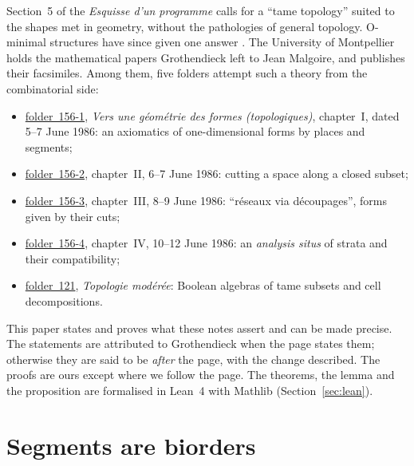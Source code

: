 \documentclass[11pt,a4paper]{amsart}
\theoremstyle{definition}
\theoremstyle{remark}
\newcommand{\fac}[1]{\href{https://grothendieck.umontpellier.fr/#1.pdf}{folder~#1}}
\begin{document}
Section~5 of the \emph{Esquisse d'un programme} \cite{esquisse} calls for a ``tame topology'' suited to the shapes met in geometry, without the pathologies of general topology. O-minimal structures have since given one answer \cite{vandendries1998}. The University of Montpellier holds the mathematical papers Grothendieck left to Jean Malgoire, and publishes their facsimiles. Among them, five folders attempt such a theory from the combinatorial side:
\begin{itemize}[leftmargin=1.5em]
\item \fac{156-1}, \emph{Vers une géométrie des formes (topologiques)}, chapter~I, dated 5--7 June 1986: an axiomatics of one-dimensional forms by places and segments;
\item \fac{156-2}, chapter~II, 6--7 June 1986: cutting a space along a closed subset;
\item \fac{156-3}, chapter~III, 8--9 June 1986: ``réseaux via découpages'', forms given by their cuts;
\item \fac{156-4}, chapter~IV, 10--12 June 1986: an \emph{analysis situs} of strata and their compatibility;
\item \fac{121}, \emph{Topologie modérée}: Boolean algebras of tame subsets and cell decompositions.
\end{itemize}
This paper states and proves what these notes assert and can be made precise. The statements are attributed to Grothendieck when the page states them; otherwise they are said to be \emph{after} the page, with the change described. The proofs are ours except where we follow the page. The theorems, the lemma and the proposition are formalised in Lean~4 with Mathlib (Section~\ref{sec:lean}).

\section{Segments are biorders}\label{sec:seg}
\end{document}
